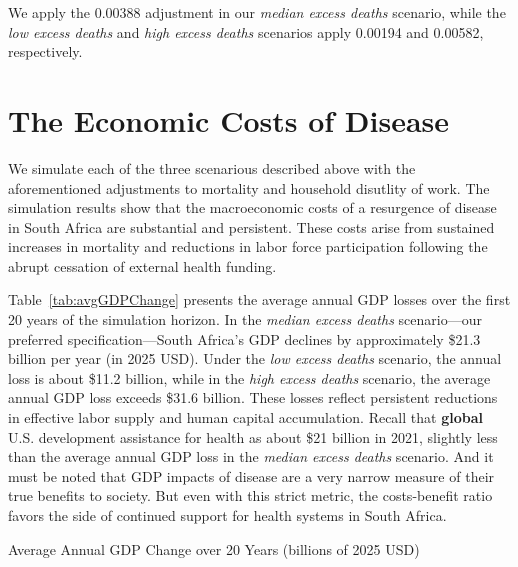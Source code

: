 \documentclass[letterpaper,12pt]{article}
\theoremstyle{definition}
\begin{document}
\begin{spacing}{1.5}
We apply the 0.00388 adjustment in our \textit{median excess deaths} scenario, while the \textit{low excess deaths} and \textit{high excess deaths} scenarios apply 0.00194 and 0.00582, respectively.




\section{The Economic Costs of Disease}\label{SecResults}

We simulate each of the three scenarious described above with the aforementioned adjustments to mortality and household disutlity of work.  The simulation results show that the macroeconomic costs of a resurgence of disease in South Africa are substantial and persistent. These costs arise from sustained increases in mortality and reductions in labor force participation following the abrupt cessation of external health funding.

Table~\ref{tab:avgGDPChange} presents the average annual GDP losses over the first 20 years of the simulation horizon. In the \textit{median excess deaths} scenario—our preferred specification—South Africa's GDP declines by approximately \$21.3 billion per year (in 2025 USD). Under the \textit{low excess deaths} scenario, the annual loss is about \$11.2 billion, while in the \textit{high excess deaths} scenario, the average annual GDP loss exceeds \$31.6 billion. These losses reflect persistent reductions in effective labor supply and human capital accumulation.  Recall that \textbf{global} U.S. development assistance for health as about \$21 billion in 2021, slightly less than the average annual GDP loss in the \textit{median excess deaths} scenario.  And it must be noted that GDP impacts of disease are a very narrow measure of their true benefits to society.  But even with this strict metric, the costs-benefit ratio favors the side of continued support for health systems in South Africa.

\begin{table}[H]
\centering
\caption{Average Annual GDP Change over 20 Years (billions of 2025 USD)}

\label{tab:avgGDPChange}
\end{table}


\end{spacing}
\end{document}
